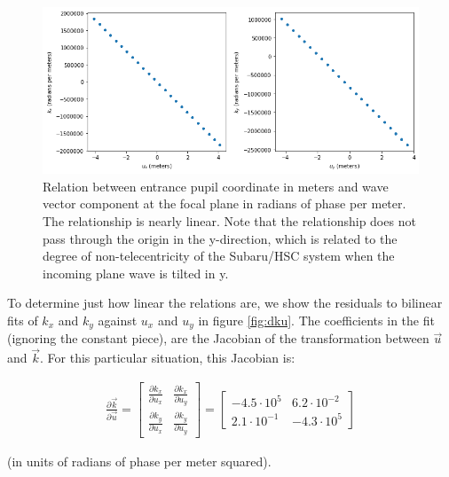 \documentclass{article}
\begin{document}
\begin{figure}
    \includegraphics[scale=0.7]{ku.png}

    \caption{Relation between entrance pupil coordinate in meters and wave vector component at the
    focal plane in radians of phase per meter. The relationship is nearly linear.  Note that the
    relationship does not pass through the origin in the y-direction, which is related to the degree
    of non-telecentricity of the Subaru/HSC system when the incoming plane wave is tilted in y.}

    \label{fig:ku}
\end{figure}

To determine just how linear the relations are, we show the residuals to bilinear fits of $k_x$ and
$k_y$ against $u_x$ and $u_y$ in figure \ref{fig:dku}.  The coefficients in the fit (ignoring the
constant piece), are the Jacobian of the transformation between $\vec{u}$ and $\vec{k}$.  For this
particular situation, this Jacobian is:


\begin{gather}
 \frac{\partial \vec{k}}{\partial \vec{u}}
 =
  \begin{bmatrix} \frac{\partial k_x}{\partial u_x} & \frac{\partial k_x}{\partial u_y} \\
                  \frac{\partial k_y}{\partial u_x} & \frac{\partial k_y}{\partial u_y} \end{bmatrix}
 =
  \begin{bmatrix}
   -4.5 \cdot 10^5 & 6.2 \cdot 10^{-2} \\
   2.1 \cdot 10^{-1} & -4.3 \cdot 10^5
   \end{bmatrix}
\end{gather}

(in units of radians of phase per meter squared).
\end{document}
